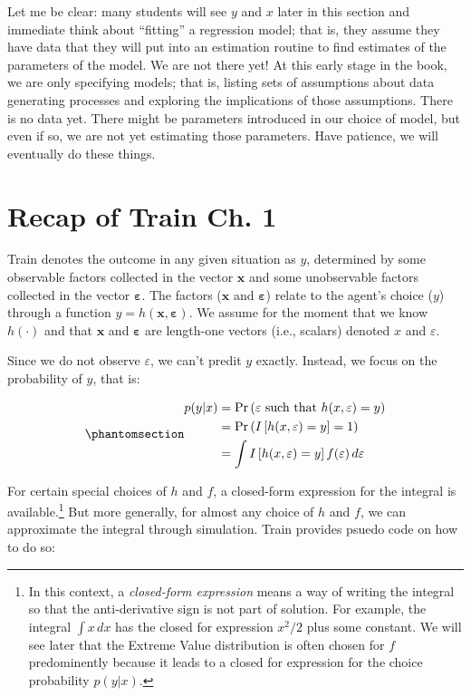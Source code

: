 \documentclass[
  letterpaper,
  DIV=11,
  numbers=noendperiod]{scrreprt}
\begin{document}
Let me be clear: many students will see \(y\) and \(x\) later in this
section and immediate think about ``fitting'' a regression model; that
is, they assume they have data that they will put into an estimation
routine to find estimates of the parameters of the model. We are not
there yet! At this early stage in the book, we are only specifying
models; that is, listing sets of assumptions about data generating
processes and exploring the implications of those assumptions. There is
no data yet. There might be parameters introduced in our choice of
model, but even if so, we are not yet estimating those parameters. Have
patience, we will eventually do these things.

\section{Recap of Train Ch. 1}\label{recap-of-train-ch.-1}

Train denotes the outcome in any given situation as \(y\), determined by
some observable factors collected in the vector \(\mathbf{x}\) and some
unobservable factors collected in the vector
\(\boldsymbol{\varepsilon}\). The factors (\(\mathbf{x}\) and
\(\boldsymbol{\varepsilon}\)) relate to the agent's choice (\(y\))
through a function \(y = h(\mathbf{x}, \boldsymbol{\varepsilon})\). We
assume for the moment that we know \(h(\cdot)\) and that \(\mathbf{x}\)
and \(\boldsymbol{\varepsilon}\) are length-one vectors (i.e., scalars)
denoted \(x\) and \(\varepsilon\).

Since we do not observe \(\varepsilon\), we can't predit \(y\) exactly.
Instead, we focus on the probability of \(y\), that is:

\begin{equation}\phantomsection\label{eq-int_indicator}{
\begin{align}
p(y|x) 
&= \Pr \left( \varepsilon \textrm{ such that } h(x,\varepsilon)=y \right) \\
&= \Pr \left( I \left[ h(x,\varepsilon)=y \right] = 1 \right) \\
&= \int I \left[ h(x,\varepsilon)=y \right] f(\varepsilon) \, d\varepsilon
\end{align}
}\end{equation}

For certain special choices of \(h\) and \(f\), a closed-form expression
for the integral is available.\footnote{In this context, a
  \emph{closed-form expression} means a way of writing the integral so
  that the anti-derivative sign is not part of solution. For example,
  the integral \(\int x \, dx\) has the closed for expression \(x^2/2\)
  plus some constant. We will see later that the Extreme Value
  distribution is often chosen for \(f\) predominently because it leads
  to a closed for expression for the choice probability \(p(y|x)\).} But
more generally, for almost any choice of \(h\) and \(f\), we can
approximate the integral through simulation. Train provides psuedo code
on how to do so:
\end{document}
